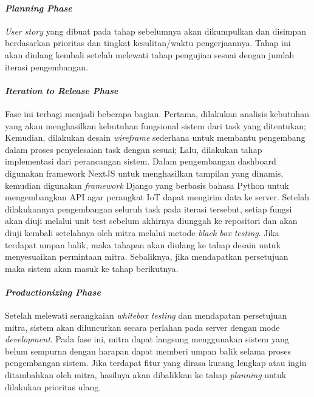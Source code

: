     \newpage

    \paragraph{\textit{Planning Phase}}

    \textit{User story} yang dibuat pada tahap sebelumnya akan dikumpulkan dan disimpan berdasarkan prioritas dan tingkat kesulitan/waktu pengerjaannya. Tahap ini akan diulang kembali setelah melewati tahap pengujian sesuai dengan jumlah iterasi pengembangan.

    \paragraph{\textit{Iteration to Release Phase}}

    Fase ini terbagi menjadi beberapa bagian. Pertama, dilakukan analisis kebutuhan yang akan menghasilkan kebutuhan fungsional sistem dari task yang ditentukan; Kemudian, dilakukan desain \textit{wireframe} sederhana untuk membantu pengembang dalam proses penyelesaian task dengan sesuai; Lalu, dilakukan tahap implementasi dari perancangan sistem. Dalam pengembangan dashboard digunakan framework NextJS untuk menghasilkan tampilan yang dinamis, kemudian digunakan \textit{framework} Django yang berbasis bahasa Python untuk mengembangkan API agar perangkat IoT dapat mengirim data ke server. Setelah dilakukannya pengembangan seluruh task pada iterasi tersebut, setiap fungsi akan diuji melalui unit test sebelum akhirnya diunggah ke repositori dan akan diuji kembali setelahnya oleh mitra melalui metode \textit{black box testing}. Jika terdapat umpan balik, maka tahapan akan diulang ke tahap desain untuk menyesuaikan permintaan mitra. Sebaliknya, jika mendapatkan persetujuan maka sistem akan masuk ke tahap berikutnya.

    \paragraph{\textit{Productionizing Phase}}

    Setelah melewati serangkaian \textit{whitebox testing} dan mendapatan persetujuan mitra, sistem akan diluncurkan secara perlahan pada server dengan mode \textit{development}. Pada fase ini, mitra dapat langsung menggunakan sistem yang belum sempurna dengan harapan dapat memberi umpan balik selama proses pengembangan sistem. Jika terdapat fitur yang dirasa kurang lengkap atau ingin ditambahkan oleh mitra, hasilnya akan dibalikkan ke tahap \textit{planning} untuk dilakukan prioritas ulang.

